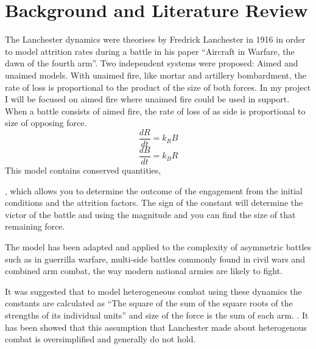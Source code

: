 \chapter{Background and Literature Review}
The Lanchester dynamics were theorises by Fredrick Lanchester in 1916 in order to model attrition rates during a battle in his paper “Aircraft in Warfare, the dawn of the fourth arm”. \cite{lanchester1995aircraft} Two independent systems were proposed: Aimed and unaimed models. With unaimed fire, like mortar and artillery bombardment, the rate of loss is proportional to the product of the size of both forces. In my project I will be focused on aimed fire where unaimed fire could be used in support. When a battle consists of aimed fire, the rate of loss of as side is proportional to size of opposing force. 
\[ \frac{dR}{dt} = k_R B\]
\[ \frac{dB}{dt} = k_B R\]
 This model contains conserved quantities,
    
, which allows you to determine the outcome of the engagement from the initial conditions and the attrition factors. The sign of the constant will determine the victor of the battle and using the magnitude and you can find the size of that remaining force. 

 The model has been adapted and applied to the complexity of asymmetric battles such as in guerrilla warfare, multi-side battles commonly found in civil wars and combined arm combat, the way modern national armies are likely to fight.

It was suggested that to model heterogeneous combat using these dynamics the constants are calculated as “The square of the sum of the square roots of the strengths of its individual units” and size of the force is the sum of each arm. \cite{lanchester1995aircraft}. It has been showed that this assumption that Lanchester made about heterogenous combat is oversimplified and generally do not hold. \cite{Lin2014}

